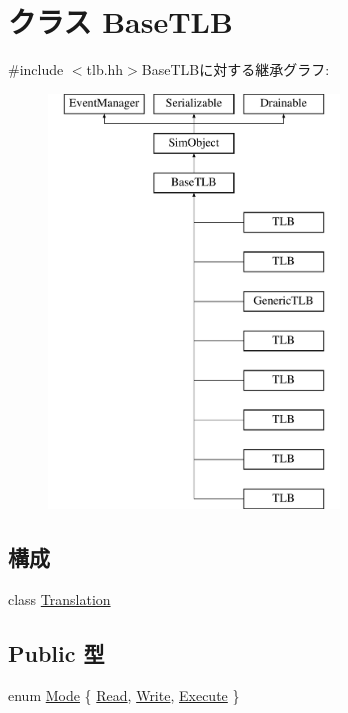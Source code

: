 \hypertarget{classBaseTLB}{
\section{クラス BaseTLB}
\label{classBaseTLB}
}


{\ttfamily \#include $<$tlb.hh$>$}BaseTLBに対する継承グラフ:\begin{figure}[H]
\begin{center}
\leavevmode
\includegraphics[height=11cm]{classBaseTLB}
\end{center}
\end{figure}
\subsection*{構成}
\begin{DoxyCompactItemize}
\item 
class \hyperlink{classBaseTLB_1_1Translation}{Translation}
\end{DoxyCompactItemize}
\subsection*{Public 型}
\begin{DoxyCompactItemize}
\item 
enum \hyperlink{classBaseTLB_a46c8a310cf4c094f8c80e1cb8dc1f911}{Mode} \{ \hyperlink{classBaseTLB_a46c8a310cf4c094f8c80e1cb8dc1f911a809abe96853e69894bbf8e5730b31348}{Read}, 
\hyperlink{classBaseTLB_a46c8a310cf4c094f8c80e1cb8dc1f911aa56670174817e3fed92bfd8182d7c0d1}{Write}, 
\hyperlink{classBaseTLB_a46c8a310cf4c094f8c80e1cb8dc1f911a31b7313c05d32519f3869a3de8be95e6}{Execute}
 \}
\end{DoxyCompactItemize}
